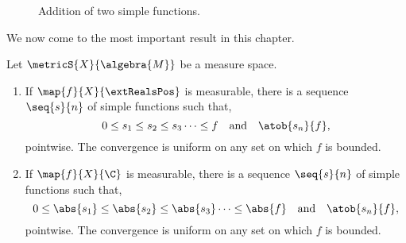 \begin{figure}
  
  \caption{Addition of two simple functions.}\label{fig:tikz:simple_func_add}
\end{figure}
We now come to the most important result in this chapter.
\begin{Theorem}[name=Approximation by simple functions]\label{thm:approx_by_simple_func}
    Let $\metricS{X}{\algebra{M}}$ be a measure space.
    \begin{enumerate}
	\item
	    If $\map{f}{X}{\extRealsPos}$ is measurable, there is a sequence $\seq{s}{n}$ of simple functions
	    such that,
	    \[0\leq s_1 \leq s_2 \leq s_3 \cdots \leq f\quad\text{and}\quad\atob{s_n}{f},\]
	    pointwise. The convergence is uniform on any set on which $f$ is bounded.
	\item
	    If $\map{f}{X}{\C}$ is measurable, there is a sequence $\seq{s}{n}$ of simple functions such that,
	    \[0\leq \abs{s_1} \leq \abs{s_2} \leq \abs{s_3} \cdots \leq \abs{f} 
		\quad\text{and}\quad\atob{s_n}{f},\]
	    pointwise. The convergence is uniform on any set on which $f$ is bounded.

    \end{enumerate}
\end{Theorem}
